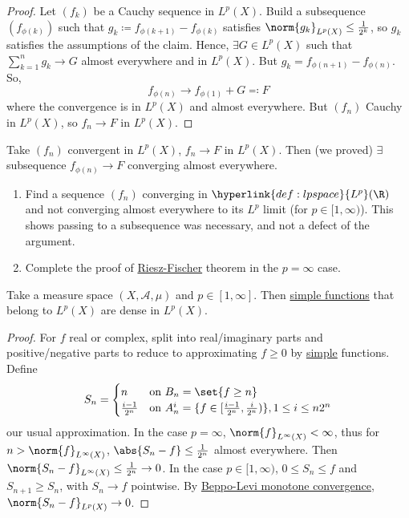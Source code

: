 \documentclass{article}
\begin{document}
\begin{proof}
    Let $(f_k)$ be a Cauchy sequence in $L^p(X)$.
    Build a subsequence $(f_{\phi(k)})$ such that $g_k \coloneqq f_{\phi(k+1)} - f_{\phi(k)}$ satisfies $\norm{g_k}_{L^p(X)} \leq \frac{1}{2^k}$, so $g_k$ satisfies the assumptions of the claim.
    Hence, $\exists G \in L^p(X)$ such that $\sum_{k=1}^n g_k \to G$ almost everywhere and in $L^p(X)$. But $g_k = f_{\phi(n+1)} - f_{\phi(n)}$.
    So,
    \begin{equation*}
        f_{\phi(n)} \longrightarrow f_{\phi(1)} + G \eqqcolon F
    \end{equation*}
    where the convergence is in $L^p(X)$ and almost everywhere.
    But $(f_n)$ Cauchy in $L^p(X)$, so $f_n \to F$ in $L^p(X)$.
\end{proof}

\begin{remark}
    Take $(f_n)$ convergent in $L^p(X)$, $f_n \to F$ in $L^p(X)$. Then (we proved) $\exists$ subsequence $f_{\phi(n)} \to F$ converging almost everywhere.
\end{remark}
\begin{ex}
    \leavevmode
    \begin{enumerate}[label=\arabic*)]
        \item Find a sequence $(f_n)$ converging in $\hyperlink{def:lpspace}{L^p}(\R)$ and not converging almost everywhere to its $L^p$ limit (for $p \in [1, \infty)$). This shows passing to a subsequence was necessary, and not a defect of the argument.
        \item Complete the proof of \hyperlink{thm:rieszFischer}{Riesz-Fischer} theorem in the $p=\infty$ case.
    \end{enumerate}
\end{ex}

\begin{thm}
    Take a measure space $(X, \mathscr{A}, \mu)$ and $p \in [1, \infty]$. Then \hyperlink{def:simple}{simple functions} that belong to \hyperlink{def:lpspace}{$L^p(X)$} are dense in $L^p(X)$.
\end{thm}
\begin{proof}
    For $f$ real or complex, split into real/imaginary parts and positive/negative parts to reduce to approximating $f \geq 0$ by \hyperlink{def:simple}{simple} functions.
    Define
    \begin{equation*}
        S_n =
        \begin{cases}
            n & \text{on } B_n = \set{f \geq n} \\
            \frac{i-1}{2^n} & \text{on } A_n^i = \{f \in [\frac{i-1}{2^n}, \frac{i}{2^n})\}, 1 \leq i \leq n 2^n
        \end{cases}
    \end{equation*}
    our usual approximation.
    In the case $p=\infty$, $\norm{f}_{L^\infty(X)} < \infty$, thus for $n > \norm{f}_{L^\infty(X)}$, $\abs{S_n-f} \leq \frac{1}{2^n}$ almost everywhere. Then $\norm{S_n-f}_{L^\infty(X)} \leq \frac{1}{2^n} \to 0$.
    In the case $p \in [1, \infty)$, $0 \leq S_n \leq f$ and $S_{n+1} \geq S_n$, with $S_n \to f$ pointwise. By \hyperlink{thm:Beppo}{Beppo-Levi monotone convergence}, $\norm{S_n - f}_{L^p(X)} \to 0$.
\end{proof}
\end{document}
